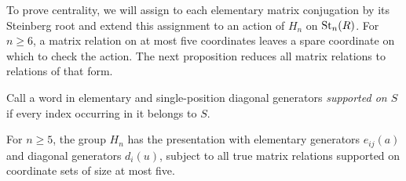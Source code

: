 To prove centrality, we will assign to each elementary matrix
conjugation by its Steinberg root and extend this assignment to an
action of $H_n$ on $\operatorname{St}_n(R)$. For $n\geq6$, a matrix relation on at
most five coordinates leaves a spare coordinate on which to check the
action. The next proposition reduces all matrix relations to relations
of that form.

Call a word in elementary and single-position diagonal generators
\emph{supported on $S$} if every index occurring in it belongs to $S$.

\begin{proposition}\label{st:small-presentation}
For $n\geq5$, the group $H_n$ has the presentation with elementary
generators $e_{ij}(a)$ and diagonal generators $d_i(u)$, subject to all
true matrix relations supported on coordinate sets of size at most
five.
\end{proposition}

